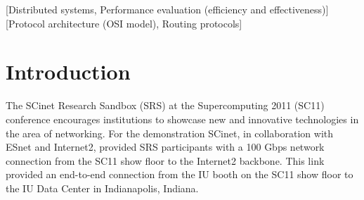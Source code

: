 \documentclass[]{sigplan-proc}
\begin{document}
\begin{abstract}

  As part of the SCinet Research Sandbox at the Supercomputing 2011 conference, Indiana University utilized a
  dedicated 100 Gbps wide area network (WAN) link spanning more than 3,500 km (2,175 mi) to demonstrate the
  capabilities of the Lustre high performance parallel file system in a high bandwidth, high latency WAN
  environment. This demonstration functioned as a proof of concept and provided an opportunity to study
  Lustre's performance over a 100 Gbps WAN. To characterize the performance of the network and file system a
  series of benchmarks and tests were undertaken. These included low level iperf network tests, Lustre
  networking (LNET) tests, file system tests with the IOR benchmark, and a suite of real-world applications reading
  and writing to the file system. All of the tests and benchmarks were run over a the WAN link with a latency
  of 50.5 ms. In this article we describe the configuration and constraints of the demonstration and focuses in
  on the key findings and discoveries made regarding the Lustre networking layer for this extremely high
  bandwidth and high latency connection. Of particular interest is the relationship between the {\tt peer\_credits}
  and {\tt max\_rpcs\_in\_flight} settings when considering LNET performance.

\end{abstract}

[Distributed systems, Performance evaluation (efficiency and effectiveness)]
[Protocol architecture (OSI model),
Routing protocols]



\section{Introduction}\label{sec:intro}

The SCinet Research Sandbox (SRS) at the Supercomputing 2011 (SC11) conference encourages institutions to
showcase new and innovative technologies in the area of networking. For the demonstration SCinet, in
collaboration with ESnet and Internet2, provided SRS participants with a 100 Gbps network connection from
the SC11 show floor to the Internet2 backbone. This link provided an end-to-end connection from the IU booth
on the SC11 show floor to the IU Data Center in Indianapolis, Indiana. 
\end{document}
